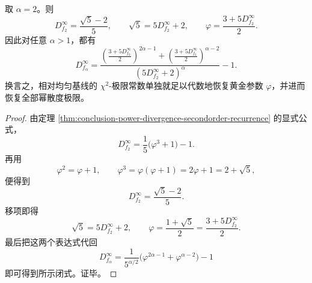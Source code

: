 \begin{corollary}\label{cor:conclusion-chi2-recovers-full-power-divergence-family}
取 \(\alpha=2\)。则
\[
\boxed{\;
D_{f_2}^\infty
=
\frac{\sqrt5-2}{5},
\qquad
\sqrt5=5D_{f_2}^\infty+2,
\qquad
\varphi=\frac{3+5D_{f_2}^\infty}{2}.\;}
\]
因此对任意 \(\alpha>1\)，都有
\[
\boxed{\;
D_{f_\alpha}^\infty
=
\frac{
\left(\frac{3+5D_{f_2}^\infty}{2}\right)^{2\alpha-1}
+
\left(\frac{3+5D_{f_2}^\infty}{2}\right)^{\alpha-2}
}{
\left(5D_{f_2}^\infty+2\right)^\alpha
}
-1.\;}
\]
换言之，相对均匀基线的 \(\chi^2\)-极限常数单独就足以代数地恢复黄金参数 \(\varphi\)，并进而恢复全部幂散度极限。
\end{corollary}
\begin{proof}
由定理 \ref{thm:conclusion-power-divergence-secondorder-recurrence} 的显式公式，
\[
D_{f_2}^\infty
=
\frac{1}{5}\bigl(\varphi^3+1\bigr)-1.
\]
再用
\[
\varphi^2=\varphi+1,
\qquad
\varphi^3=\varphi(\varphi+1)=2\varphi+1=2+\sqrt5,
\]
便得到
\[
D_{f_2}^\infty=\frac{\sqrt5-2}{5}.
\]
移项即得
\[
\sqrt5=5D_{f_2}^\infty+2,
\qquad
\varphi=\frac{1+\sqrt5}{2}=\frac{3+5D_{f_2}^\infty}{2}.
\]
最后把这两个表达式代回
\[
D_{f_\alpha}^\infty
=
\frac{1}{5^{\alpha/2}}\bigl(\varphi^{2\alpha-1}+\varphi^{\alpha-2}\bigr)-1
\]
即可得到所示闭式。证毕。
\end{proof}



